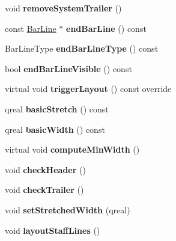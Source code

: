 \begin{DoxyCompactItemize}
\mbox{\label{class_ms_1_1_measure_a95d953121aa2ea9b6db91e2b147fed50}} 
void {\bfseries remove\+System\+Trailer} ()
\item 
\mbox{\label{class_ms_1_1_measure_a611694524ac414310b280c48d9870eb1}} 
const \hyperlink{class_ms_1_1_bar_line}{Bar\+Line} $\ast$ {\bfseries end\+Bar\+Line} () const
\item 
\mbox{\label{class_ms_1_1_measure_a56ea1206c77157ef1f5ef91f062f3296}} 
Bar\+Line\+Type {\bfseries end\+Bar\+Line\+Type} () const
\item 
\mbox{\label{class_ms_1_1_measure_ab2ed1822b680aff4926b625e1e1289ac}} 
bool {\bfseries end\+Bar\+Line\+Visible} () const
\item 
\mbox{\label{class_ms_1_1_measure_aa7a17a610f625dc8042ea9e16be018ed}} 
virtual void {\bfseries trigger\+Layout} () const override
\item 
\mbox{\label{class_ms_1_1_measure_ae941c476b82dd103f64991ee3fff131f}} 
qreal {\bfseries basic\+Stretch} () const
\item 
\mbox{\label{class_ms_1_1_measure_adb1f30fc6074d80e6c323f9b9655124b}} 
qreal {\bfseries basic\+Width} () const
\item 
\mbox{\label{class_ms_1_1_measure_aba9ac566a83090c50486bf155a795ea8}} 
virtual void {\bfseries compute\+Min\+Width} ()
\item 
\mbox{\label{class_ms_1_1_measure_a8b08d9e9607782a9400c16140e243112}} 
void {\bfseries check\+Header} ()
\item 
\mbox{\label{class_ms_1_1_measure_a5c2da938ad615b8d3d2adccf77eb2059}} 
void {\bfseries check\+Trailer} ()
\item 
\mbox{\label{class_ms_1_1_measure_a22744d7e30b8487ed3880ad5dc2c2078}} 
void {\bfseries set\+Stretched\+Width} (qreal)
\item 
\mbox{\label{class_ms_1_1_measure_a4a1ae88c341d451822e9c710fffdba10}} 
void {\bfseries layout\+Staff\+Lines} ()
\end{DoxyCompactItemize}
